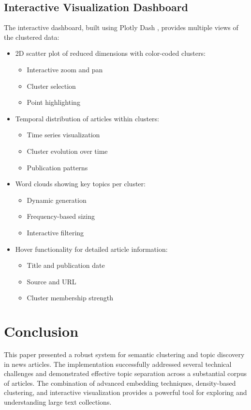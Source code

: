 \documentclass[conference]{IEEEtran}
\begin{document}
\subsection{Interactive Visualization Dashboard}
The interactive dashboard, built using Plotly Dash \cite{plotly2015}, provides multiple views of the clustered data:
\begin{itemize}
    \item 2D scatter plot of reduced dimensions with color-coded clusters:
        \begin{itemize}
            \item Interactive zoom and pan
            \item Cluster selection
            \item Point highlighting
        \end{itemize}
    \item Temporal distribution of articles within clusters:
        \begin{itemize}
            \item Time series visualization
            \item Cluster evolution over time
            \item Publication patterns
        \end{itemize}
    \item Word clouds showing key topics per cluster:
        \begin{itemize}
            \item Dynamic generation
            \item Frequency-based sizing
            \item Interactive filtering
        \end{itemize}
    \item Hover functionality for detailed article information:
        \begin{itemize}
            \item Title and publication date
            \item Source and URL
            \item Cluster membership strength
        \end{itemize}
\end{itemize}

\section{Conclusion}
This paper presented a robust system for semantic clustering and topic discovery in news articles. The implementation successfully addressed several technical challenges and demonstrated effective topic separation across a substantial corpus of articles. The combination of advanced embedding techniques, density-based clustering, and interactive visualization provides a powerful tool for exploring and understanding large text collections.
\end{document}
